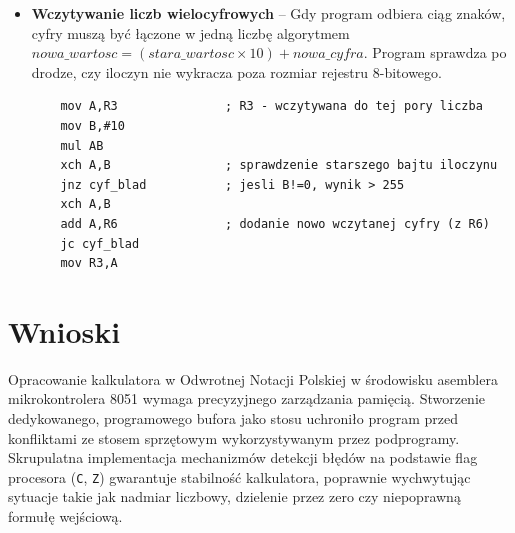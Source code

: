 \documentclass[11pt, a4paper]{article}
\begin{document}
\begin{itemize}
    \item \textbf{Wczytywanie liczb wielocyfrowych} -- Gdy program odbiera ciąg znaków, cyfry muszą być łączone w jedną liczbę algorytmem $nowa\_wartosc = (stara\_wartosc \times 10) + nowa\_cyfra$. Program sprawdza po drodze, czy iloczyn nie wykracza poza rozmiar rejestru 8-bitowego.
\begin{lstlisting}
    mov A,R3               ; R3 - wczytywana do tej pory liczba
    mov B,#10
    mul AB
    xch A,B                ; sprawdzenie starszego bajtu iloczynu
    jnz cyf_blad           ; jesli B!=0, wynik > 255
    xch A,B                
    add A,R6               ; dodanie nowo wczytanej cyfry (z R6)
    jc cyf_blad
    mov R3,A
\end{lstlisting}
\end{itemize}

\section{Wnioski}
Opracowanie kalkulatora w Odwrotnej Notacji Polskiej w środowisku asemblera mikrokontrolera 8051 wymaga precyzyjnego zarządzania pamięcią. Stworzenie dedykowanego, programowego bufora jako stosu uchroniło program przed konfliktami ze stosem sprzętowym wykorzystywanym przez podprogramy. Skrupulatna implementacja mechanizmów detekcji błędów na podstawie flag procesora (\texttt{C}, \texttt{Z}) gwarantuje stabilność kalkulatora, poprawnie wychwytując sytuacje takie jak nadmiar liczbowy, dzielenie przez zero czy niepoprawną formułę wejściową.
\end{document}
